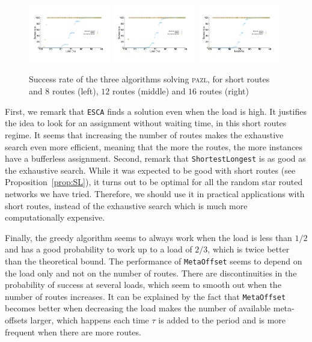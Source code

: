 \documentclass[a4paper,10pt]{article}
\newcommand\shortestlongest{\texttt{ShortestLongest}\xspace}
\newcommand\metaoffset{\texttt{MetaOffset}\xspace}
\newcommand\ESCA{\texttt{ESCA}\xspace}
\newcommand\pazl{\textsc{pazl}\xspace}
\begin{document}
      \begin{figure}[h]
      \begin{center}
	 \includegraphics[width=0.32\textwidth]{pazlshort8.pdf}
	 \includegraphics[width=0.32\textwidth]{pazlshort12.pdf}
	 \includegraphics[width=0.32\textwidth]{pazlshort16.pdf}
      \end{center}
      \caption{Success rate of the three algorithms solving \pazl, for short routes and $8$ routes (left), $12$ routes (middle) and $16$ routes (right)}\label{fig:short}
      \end{figure}

      First, we remark that \ESCA finds a solution even when the load is high. It justifies the idea to look for an assignment without waiting time, in this short routes regime. 
      It seems that increasing the number of routes makes the exhaustive search even more efficient, meaning that the more the routes, the more instances have a bufferless assignment. 
      Second, remark that \shortestlongest is as good as the exhaustive search. While it was expected to be good with short routes (see Proposition~\ref{prop:SL}), it turns out to be optimal for all the random star routed networks we have tried. Therefore, we should use it in practical applications with short routes, instead of the exhaustive search which is much more computationally expensive. 

      Finally, the greedy algorithm seems to always work when the load is less than $1/2$ and has a good probability to work up to a load of $2/3$, which is twice better than the theoretical bound. The performance of \metaoffset seems to depend on the load only and not on the number of routes. There are discontinuities in the probability of success at several loads, which seem to smooth out when the number of routes increases. It can be explained by the fact that \metaoffset becomes better when decreasing the load makes the number of available meta-offsets larger, which happens each time $\tau$ is added to the period and is more frequent when there are more routes.
      
\end{document}
